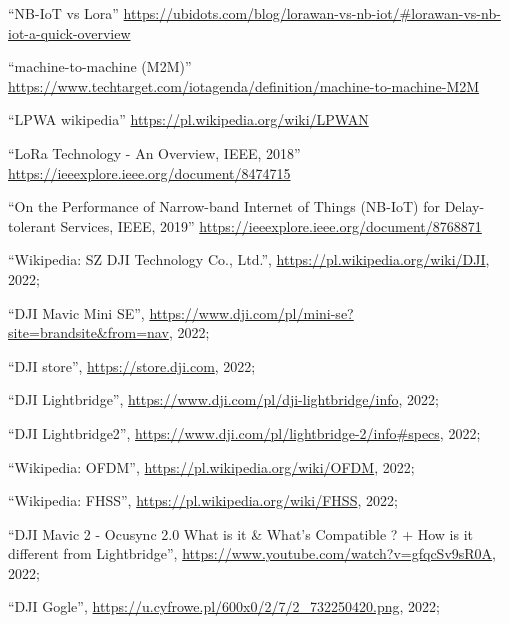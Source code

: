 \documentclass[12pt, a4paper, twoside]{report}
\newcommand{\bibTitle}[1]{``#1''}
\begin{document}
\begin{thebibliography}{999}

\bibTitle{NB-IoT vs Lora}
\url{https://ubidots.com/blog/lorawan-vs-nb-iot/#lorawan-vs-nb-iot-a-quick-overview}

\bibTitle{machine-to-machine (M2M)}
\url{https://www.techtarget.com/iotagenda/definition/machine-to-machine-M2M}

\bibTitle{LPWA wikipedia}
\url{https://pl.wikipedia.org/wiki/LPWAN}

\bibTitle{LoRa Technology - An Overview, IEEE, 2018}
\url{https://ieeexplore.ieee.org/document/8474715}


\bibTitle{On the Performance of Narrow-band Internet of
Things (NB-IoT) for Delay-tolerant Services, IEEE, 2019}
\url{https://ieeexplore.ieee.org/document/8768871}


\bibTitle{Wikipedia: SZ DJI Technology Co., Ltd.},
\url{https://pl.wikipedia.org/wiki/DJI}, 2022;

\bibTitle{DJI Mavic Mini SE},
\url{https://www.dji.com/pl/mini-se?site=brandsite&from=nav}, 2022;

\bibTitle{DJI store},
\url{https://store.dji.com}, 2022;

\bibTitle{DJI Lightbridge},
\url{https://www.dji.com/pl/dji-lightbridge/info}, 2022;

\bibTitle{DJI Lightbridge2},
\url{https://www.dji.com/pl/lightbridge-2/info#specs}, 2022;

\bibTitle{Wikipedia: OFDM},
\url{https://pl.wikipedia.org/wiki/OFDM}, 2022;

\bibTitle{Wikipedia: FHSS},
\url{https://pl.wikipedia.org/wiki/FHSS}, 2022;

\bibTitle{DJI Mavic 2 - Ocusync 2.0 What is it \& What's Compatible ? + How is it different from Lightbridge},
\url{https://www.youtube.com/watch?v=gfqcSv9sR0A}, 2022;

\bibTitle{DJI Gogle},
\url{https://u.cyfrowe.pl/600x0/2/7/2_732250420.png}, 2022;



\end{thebibliography}
\end{document}
